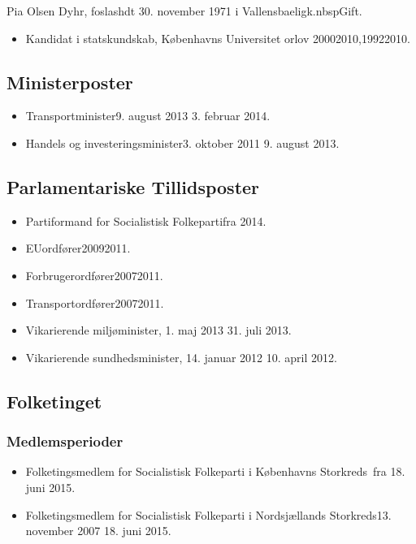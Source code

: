 \documentclass[11pt, a4paper]{awesome-cv}
\begin{document}
\makecvheader[R]
\makelettertitle
\begin{cvletter}
Pia Olsen Dyhr, foslashdt 30. november 1971 i Vallensbaeligk.nbspGift.

\begin{itemize}
\item Kandidat i statskundskab, Københavns Universitet orlov 20002010,19922010.
\end{itemize}
\subsection*{Ministerposter}
\begin{itemize}
\item Transportminister9. august 2013  3. februar 2014.
\item Handels og investeringsminister3. oktober 2011  9. august 2013.
\end{itemize}
\subsection*{Parlamentariske Tillidsposter}
\begin{itemize}
\item Partiformand for Socialistisk Folkepartifra 2014.
\item EUordfører20092011.
\item Forbrugerordfører20072011.
\item Transportordfører20072011.
\item Vikarierende miljøminister, 1. maj 2013    31. juli 2013.
\item Vikarierende sundhedsminister, 14. januar 2012   10. april 2012.
\end{itemize}
\subsection*{Folketinget}
\subsubsection*{Medlemsperioder}
\begin{itemize}
\item Folketingsmedlem for Socialistisk Folkeparti i Københavns Storkreds fra 18. juni 2015.
\item Folketingsmedlem for Socialistisk Folkeparti i Nordsjællands Storkreds13. november 2007  18. juni 2015.
\end{itemize}

\end{cvletter}
\end{document}
